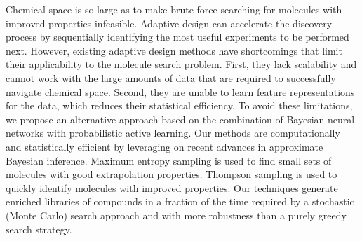 
Chemical space is so large as to make brute force searching for molecules with
improved properties infeasible. Adaptive design can accelerate the discovery
process by sequentially identifying the most useful experiments to be performed
next. However, existing adaptive design methods have shortcomings that limit
their applicability to the molecule search problem. First, they lack
scalability and cannot work with the large amounts of data that are required to
successfully navigate chemical space. Second, they are unable to learn feature
representations for the data, which reduces their statistical efficiency. To
avoid these limitations, we propose an alternative approach based on the
combination of Bayesian neural networks with probabilistic active learning. Our
methods are computationally and statistically efficient by leveraging on recent
advances in approximate Bayesian inference. Maximum entropy sampling is used
to find small sets of molecules with good extrapolation properties. Thompson
sampling is used to quickly identify molecules with improved properties. Our
techniques generate enriched libraries of compounds in a fraction
of the time required by a stochastic (Monte Carlo) search approach and with
more robustness than a purely greedy search strategy.

